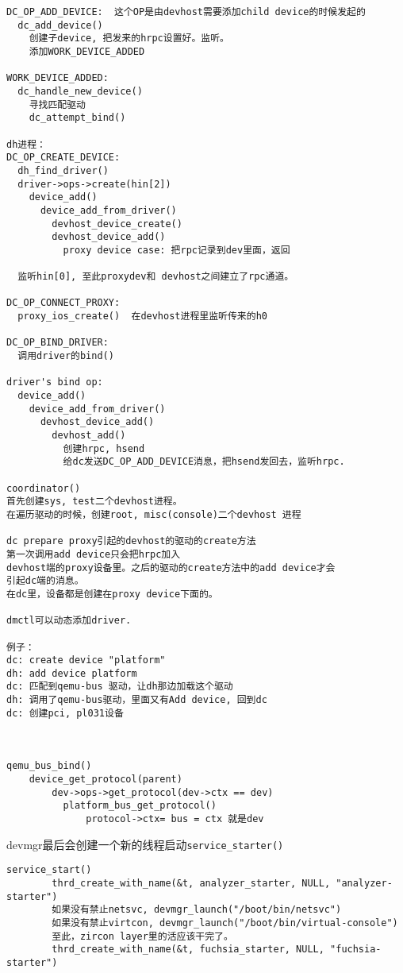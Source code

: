 \begin{verbatim}
DC_OP_ADD_DEVICE:  这个OP是由devhost需要添加child device的时候发起的
  dc_add_device()
    创建子device, 把发来的hrpc设置好。监听。
    添加WORK_DEVICE_ADDED

WORK_DEVICE_ADDED:
  dc_handle_new_device()
    寻找匹配驱动
    dc_attempt_bind()
                
dh进程：
DC_OP_CREATE_DEVICE:
  dh_find_driver()
  driver->ops->create(hin[2])
    device_add()
      device_add_from_driver()
        devhost_device_create()
        devhost_device_add()
          proxy device case: 把rpc记录到dev里面，返回
          
  监听hin[0], 至此proxydev和 devhost之间建立了rpc通道。

DC_OP_CONNECT_PROXY:
  proxy_ios_create()  在devhost进程里监听传来的h0

DC_OP_BIND_DRIVER:
  调用driver的bind()

driver's bind op:
  device_add()
    device_add_from_driver()
      devhost_device_add()
        devhost_add()
          创建hrpc, hsend
          给dc发送DC_OP_ADD_DEVICE消息，把hsend发回去，监听hrpc.

coordinator()
首先创建sys, test二个devhost进程。
在遍历驱动的时候，创建root, misc(console)二个devhost 进程

dc prepare proxy引起的devhost的驱动的create方法
第一次调用add device只会把hrpc加入
devhost端的proxy设备里。之后的驱动的create方法中的add device才会
引起dc端的消息。
在dc里，设备都是创建在proxy device下面的。

dmctl可以动态添加driver.

例子：
dc: create device "platform"
dh: add device platform
dc: 匹配到qemu-bus 驱动，让dh那边加载这个驱动
dh: 调用了qemu-bus驱动，里面又有Add device, 回到dc
dc: 创建pci, pl031设备



qemu_bus_bind()
    device_get_protocol(parent)
        dev->ops->get_protocol(dev->ctx == dev)
          platform_bus_get_protocol()
              protocol->ctx= bus = ctx 就是dev
\end{verbatim}

devmgr最后会创建一个新的线程启动\verb|service_starter()|
\begin{verbatim}
service_start()
        thrd_create_with_name(&t, analyzer_starter, NULL, "analyzer-starter")
        如果没有禁止netsvc, devmgr_launch("/boot/bin/netsvc")
        如果没有禁止virtcon, devmgr_launch("/boot/bin/virtual-console")
        至此，zircon layer里的活应该干完了。
        thrd_create_with_name(&t, fuchsia_starter, NULL, "fuchsia-starter")
\end{verbatim}

